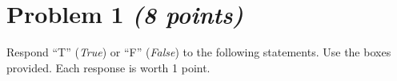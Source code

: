 \documentclass[11pt,twoside]{article}
\newcommand{\?}{\stackrel{?}{=}}
\newcommand{\gr}{\color{green!40!black}}
\begin{document}



 

  
  



\section*{Problem 1 \textit{(8 points)}}

Respond ``T'' ({\it True})  or  ``F'' (\textit{False}) to the following statements. Use the boxes provided. Each response is worth 1 point.
\end{document}
